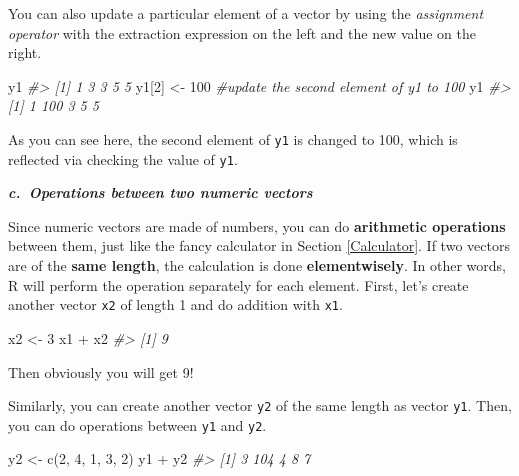 \documentclass[
]{book}
\newenvironment{Shaded}{\begin{snugshade}}{\end{snugshade}}
\newcommand{\CommentTok}[1]{\textcolor[rgb]{0.56,0.35,0.01}{\textit{#1}}}
\newcommand{\DecValTok}[1]{\textcolor[rgb]{0.00,0.00,0.81}{#1}}
\newcommand{\FunctionTok}[1]{\textcolor[rgb]{0.00,0.00,0.00}{#1}}
\newcommand{\NormalTok}[1]{#1}
\newcommand{\OtherTok}[1]{\textcolor[rgb]{0.56,0.35,0.01}{#1}}
\newcommand{\SpecialCharTok}[1]{\textcolor[rgb]{0.00,0.00,0.00}{#1}}
\begin{document}
You can also update a particular element of a vector by using the \emph{assignment operator} with the extraction expression on the left and the new value on the right.

\begin{Shaded}
\begin{Highlighting}[]
\NormalTok{y1}
\CommentTok{\#\textgreater{} [1] 1 3 3 5 5}
\NormalTok{y1[}\DecValTok{2}\NormalTok{] }\OtherTok{\textless{}{-}} \DecValTok{100}     \CommentTok{\#update the second element of \textasciigrave{}y1\textasciigrave{} to 100}
\NormalTok{y1}
\CommentTok{\#\textgreater{} [1]   1 100   3   5   5}
\end{Highlighting}
\end{Shaded}

As you can see here, the second element of \texttt{y1} is changed to 100, which is reflected via checking the value of \texttt{y1}.

\textbf{\emph{c.~Operations between two numeric vectors}}

Since numeric vectors are made of numbers, you can do \textbf{arithmetic operations} between them, just like the fancy calculator in Section \ref{Calculator}. If two vectors are of the \textbf{same length}, the calculation is done \textbf{elementwisely}. In other words, R will perform the operation separately for each element. First, let's create another vector \texttt{x2} of length 1 and do addition with \texttt{x1}.

\begin{Shaded}
\begin{Highlighting}[]
\NormalTok{x2 }\OtherTok{\textless{}{-}} \DecValTok{3}
\NormalTok{x1 }\SpecialCharTok{+}\NormalTok{ x2}
\CommentTok{\#\textgreater{} [1] 9}
\end{Highlighting}
\end{Shaded}

Then obviously you will get 9!

Similarly, you can create another vector \texttt{y2} of the same length as vector \texttt{y1}. Then, you can do operations between \texttt{y1} and \texttt{y2}.

\begin{Shaded}
\begin{Highlighting}[]
\NormalTok{y2 }\OtherTok{\textless{}{-}} \FunctionTok{c}\NormalTok{(}\DecValTok{2}\NormalTok{, }\DecValTok{4}\NormalTok{, }\DecValTok{1}\NormalTok{, }\DecValTok{3}\NormalTok{, }\DecValTok{2}\NormalTok{)}
\NormalTok{y1 }\SpecialCharTok{+}\NormalTok{ y2}
\CommentTok{\#\textgreater{} [1]   3 104   4   8   7}
\end{Highlighting}
\end{Shaded}
\end{document}
